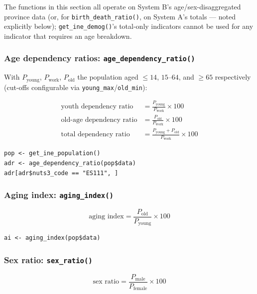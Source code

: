 \documentclass[11pt]{article}
\newcommand{\fn}[1]{\texttt{#1}}
\begin{document}
The functions in this section all operate on System B's age/sex-disaggregated
province data (or, for \fn{birth\_death\_ratio()}, on System A's totals ---
noted explicitly below); \fn{get\_ine\_demog()}'s total-only indicators
cannot be used for any indicator that requires an age breakdown.

\subsubsection{Age dependency ratios: \fn{age\_dependency\_ratio()}}

With $P_{\text{young}}$, $P_{\text{work}}$, $P_{\text{old}}$ the population
aged $\leq 14$, $15$--$64$, and $\geq 65$ respectively (cut-offs
configurable via \fn{young\_max}/\fn{old\_min}):

\begin{align}
\text{youth dependency ratio} &= \frac{P_{\text{young}}}{P_{\text{work}}}\times 100 \\
\text{old-age dependency ratio} &= \frac{P_{\text{old}}}{P_{\text{work}}}\times 100 \\
\text{total dependency ratio} &= \frac{P_{\text{young}}+P_{\text{old}}}{P_{\text{work}}}\times 100
\end{align}

\begin{lstlisting}
pop <- get_ine_population()
adr <- age_dependency_ratio(pop$data)
adr[adr$nuts3_code == "ES111", ]
\end{lstlisting}

\subsubsection{Aging index: \fn{aging\_index()}}

\begin{equation}
\text{aging index} = \frac{P_{\text{old}}}{P_{\text{young}}}\times 100
\end{equation}

\begin{lstlisting}
ai <- aging_index(pop$data)
\end{lstlisting}

\subsubsection{Sex ratio: \fn{sex\_ratio()}}

\begin{equation}
\text{sex ratio} = \frac{P_{\text{male}}}{P_{\text{female}}}\times 100
\end{equation}
\end{document}
